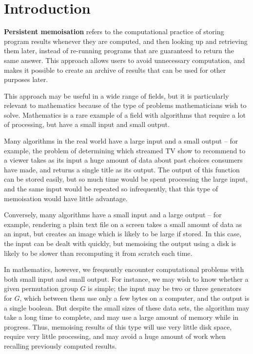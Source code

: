 \documentclass{deliverablereport}
\author{Michael Torpey}
\begin{document}
\maketitle
\githubissuedescription


\section{Introduction}
\label{sec:intro}

\textbf{Persistent memoisation} refers to the computational practice of storing
program results whenever they are computed, and then looking up and retrieving
them later, instead of re-running programs that are guaranteed to return the
same answer.  This approach allows users to avoid unnecessary computation, and
makes it possible to create an archive of results that can be used for other
purposes later.

This approach may be useful in a wide range of fields, but it is particularly
relevant to mathematics because of the type of problems mathematicians wish to
solve.  Mathematics is a rare example of a field with algorithms that require a
lot of processing, but have a small input and small output.

Many algorithms in the real world have a large input and a small output -- for
example, the problem of determining which streamed TV show to recommend to a
viewer takes as its input a huge amount of data about past choices consumers
have made, and returns a single title as its output.  The output of this
function can be stored easily, but so much time would be spent processing the
large input, and the same input would be repeated so infrequently, that this
type of memoisation would have little advantage.

Conversely, many algorithms have a small input and a large output -- for
example, rendering a plain text file on a screen takes a small amount of data as
an input, but creates an image which is likely to be large if stored.  In this
case, the input can be dealt with quickly, but memoising the output using a disk
is likely to be slower than recomputing it from scratch each time.

In mathematics, however, we frequently encounter computational problems with
both small input and small output.  For instance, we may wish to know whether a
given permutation group $G$ is simple; the input may be two or three generators
for $G$, which between them use only a few bytes on a computer, and the output
is a single boolean.  But despite the small sizes of these data sets, the
algorithm may take a long time to complete, and may use a large amount of memory
while in progress.  Thus, memoising results of this type will use very little
disk space, require very little processing, and may avoid a huge amount of work
when recalling previously computed results.
\end{document}
